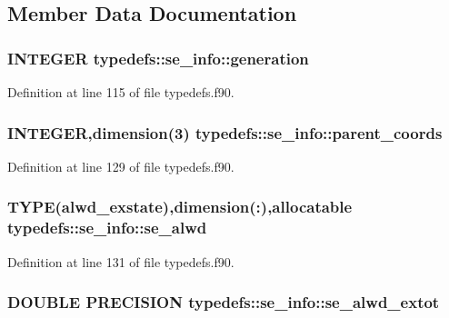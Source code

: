 \subsection{Member Data Documentation}
\hypertarget{typetypedefs_1_1se__info_aa87601b1b02d6f3982236107d5cdc350}{
\subsubsection[{generation}]{\setlength{\rightskip}{0pt plus 5cm}INTEGER {\bf typedefs::se\_\-info::generation}}}
\label{typetypedefs_1_1se__info_aa87601b1b02d6f3982236107d5cdc350}


Definition at line 115 of file typedefs.f90.\hypertarget{typetypedefs_1_1se__info_a8bd5d9742b432404882c43eeb9378ef5}{
\subsubsection[{parent\_\-coords}]{\setlength{\rightskip}{0pt plus 5cm}INTEGER,dimension(3) {\bf typedefs::se\_\-info::parent\_\-coords}}}
\label{typetypedefs_1_1se__info_a8bd5d9742b432404882c43eeb9378ef5}


Definition at line 129 of file typedefs.f90.\hypertarget{typetypedefs_1_1se__info_a208e6628ee7993cd5df24be28c3835fc}{
\subsubsection[{se\_\-alwd}]{\setlength{\rightskip}{0pt plus 5cm}TYPE({\bf alwd\_\-exstate}),dimension(:),allocatable {\bf typedefs::se\_\-info::se\_\-alwd}}}
\label{typetypedefs_1_1se__info_a208e6628ee7993cd5df24be28c3835fc}


Definition at line 131 of file typedefs.f90.\hypertarget{typetypedefs_1_1se__info_a2df8b473f04eca6790c23fcf8721af2d}{
\subsubsection[{se\_\-alwd\_\-extot}]{\setlength{\rightskip}{0pt plus 5cm}DOUBLE PRECISION {\bf typedefs::se\_\-info::se\_\-alwd\_\-extot}}}
\label{typetypedefs_1_1se__info_a2df8b473f04eca6790c23fcf8721af2d}



